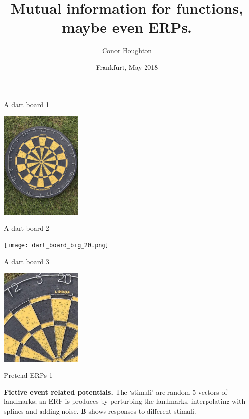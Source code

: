 \documentclass{beamer}
\title[Mutual information for functions.]{Mutual information for functions, maybe even ERPs.}
\author{Conor Houghton}
\institute{CS, U Bristol}
\date{Frankfurt, May 2018}
\begin{document}
\maketitle



\begin{frame}{A dart board 1}
\color{reddish}
\begin{center}
\includegraphics[width=4cm]{dart_board.jpg}
\end{center}
\color{black}
\vfill
\color{gray}
\color{black}
\end{frame}


\begin{frame}{A dart board 2}
\color{reddish}
\begin{center}
\texttt{[image: dart\_board\_big\_20.png]}
\end{center}
\color{black}
\end{frame}


\begin{frame}{A dart board 3}
\color{reddish}
\begin{center}
\includegraphics[width=4cm]{dart_board_zoom.png}
\end{center}
\color{black}
\end{frame}


\begin{frame}{Pretend ERPs 1}
\color{reddish}
\begin{center}

\end{center}
\color{black} \textbf{Fictive event related potentials.} The
\lq{}stimuli\rq{} are random 5-vectors of landmarks; an ERP is
produces by perturbing the landmarks, interpolating with splines and
adding noise. \textbf{B} shows responses to different stimuli.
\color{black}
\end{frame}
\end{document}

